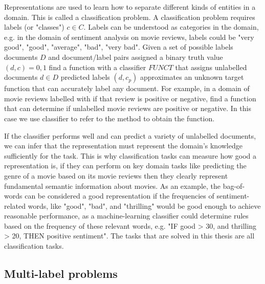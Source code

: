Representations are  used to learn how to separate different kinds of entities in a domain. This is called a classification problem. A classification problem requires  labels (or "classes") $c \in C$. Labels can be understood as categories in the domain, e.g. in the domain of sentiment analysis on movie reviews, labels could be "very good", "good", "average", "bad", "very bad". Given a set of possible labels documents $D$ and document/label pairs assigned a binary truth value $(d, c) = {0, 1}$ find a function with a classifier $FUNCT$ that assigns unlabelled documents $d \in D$ predicted labels $(d, c_p) $ approximates an unknown target function that can accurately label any document. For example, in a domain of movie reviews labelled with if that review is positive or negative, find a function that can determine if unlabelled movie reviews are positive or negative. In this case we use classifier to refer to the method to obtain the function.

If the classifier performs well and can predict a variety of unlabelled documents, we can infer that  the representation must represent the domain's knowledge sufficiently for the task. This is why classification tasks can measure how good a representation is, if they can perform on key domain tasks like predicting the genre of a movie based on its movie reviews then they clearly represent fundamental semantic information about movies.  As an example,  the bag-of-words can be considered a good representation if the frequencies of sentiment-related words, like "good", "bad", and "thrilling" would be good enough to achieve reasonable performance, as a machine-learning classifier could determine rules based on the frequency of these relevant words, e.g. "IF good > 30, and thrilling > 20, THEN positive sentiment". The tasks that are solved in this thesis are all classification tasks. 


\subsection{Multi-label problems}\label{bg:multi-label}





